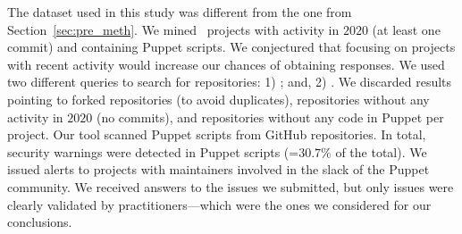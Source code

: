 The dataset used in this study was different from the one from 
Section~\ref{sec:pre_meth}. 
We mined \github\ projects with activity in $2020$ 
(at least one commit) and containing Puppet scripts. 
We conjectured that focusing on projects with recent activity would increase 
our chances of obtaining responses. We used two different queries to search for 
repositories: 1) ; and, 2) . 
We discarded results pointing to forked repositories (to avoid
duplicates), repositories without any activity in $2020$ (no commits),
and repositories without any code in Puppet per project. Our tool
scanned \botTotalScripts{} Puppet scripts from \botWarningsRepos{}
GitHub repositories. In total, \botTotalWarnings{} security warnings
were detected in \botScriptsWarnings{} Puppet scripts (=$30.7\%$ of
the total). We issued alerts to projects with maintainers involved 
in the slack of the Puppet community. We received \botTotalIssuesAnswers{} answers to 
the \botTotalIssues{} issues we submitted, but only \botFinalIssues{}
issues were clearly validated by practitioners---which were 
the ones we considered for our conclusions.

